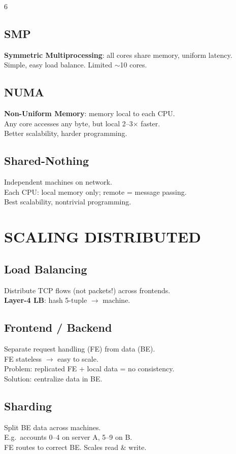 \documentclass[10pt,landscape,letterpaper]{article}
\newcommand{\concept}[1]{\textcolor{conceptcyan}{\textbf{#1}}}
\newcommand{\process}[1]{\textcolor{processpurple}{\textbf{#1}}}
\begin{document}
\begin{multicols}{6}
\subsection{SMP}
\concept{Symmetric Multiprocessing}: all cores share memory, uniform latency.\\
Simple, easy load balance. Limited $\sim$10 cores.

\subsection{NUMA}
\concept{Non-Uniform Memory}: memory local to each CPU.\\
Any core accesses any byte, but local 2--3$\times$ faster.\\
Better scalability, harder programming.

\subsection{Shared-Nothing}
Independent machines on network.\\
Each CPU: local memory only; remote = message passing.\\
Best scalability, nontrivial programming.

\section{SCALING DISTRIBUTED}
\subsection{Load Balancing}
Distribute TCP flows (not packets!) across frontends.\\
\process{Layer-4 LB}: hash 5-tuple $\to$ machine.

\subsection{Frontend / Backend}
Separate request handling (FE) from data (BE).\\
FE stateless $\to$ easy to scale.\\
Problem: replicated FE + local data = no consistency.\\
Solution: centralize data in BE.

\subsection{Sharding}
Split BE data across machines.\\
E.g.\ accounts 0--4 on server A, 5--9 on B.\\
FE routes to correct BE. Scales read \& write.


\end{multicols}
\end{document}
